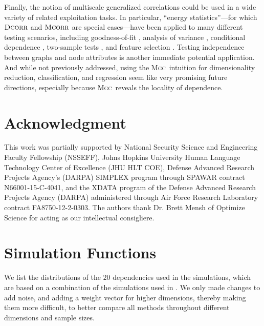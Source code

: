 \documentclass[11pt]{article}
\newcommand{\note}[2][]{\added[#1,remark={#2}]{}}
\providecommand{\sct}[1]{{\normalfont\textsc{#1}}}
\newcommand{\Mgc}{\sct{Mgc}}
\newcommand{\Dcorr}{\sct{Dcorr}}
\newcommand{\Mcorr}{\sct{Mcorr}}
\newcommand{\jv}[1]{{\note{jv: #1}}}
\newcommand{\cs}[1]{{\note{cs: #1}}}
\begin{document}
Finally, the notion of multiscale generalized correlations could be used in a wide variety of related exploitation tasks.  In particular, ``energy statistics''---for which $\Dcorr$ and $\Mcorr$ are special cases---have been applied to many different testing scenarios, including goodness-of-fit  \cite{Szekely2005}, analysis of variance  \cite{Rizzo2010}, conditional dependence  \cite{Szekely2014,Wang2015},  two-sample tests \cite{Szekely2004}, and feature selection \cite{LiZhongZhu2012,Zhong2015}.   
Testing independence between graphs and node attributes \cite{Fosdick2015} is another immediate potential application.  And while not previously addressed, using the \Mgc~intuition for dimensionality reduction, classification, and regression seem like very promising future directions, especially because \Mgc~reveals the locality of dependence.








\section*{Acknowledgment}
This work was partially supported by
%
National Security Science and Engineering Faculty Fellowship (NSSEFF),
%
Johns Hopkins University Human Language Technology Center of Excellence (JHU HLT COE),
%
Defense Advanced Research Projects Agency's (DARPA) SIMPLEX program through SPAWAR contract N66001-15-C-4041,
%
and the XDATA program of the Defense Advanced Research Projects Agency (DARPA) administered through Air Force Research Laboratory contract FA8750-12-2-0303. The authors thank Dr. Brett Mensh of Optimize Science for acting as our intellectual consigliere.


\clearpage
\appendix
\setcounter{figure}{0}
\renewcommand\thefigure{A\arabic{figure}}

\section{Simulation Functions}
\label{appen:function}

We list the distributions of the $20$ dependencies used in the simulations, which are based on a combination of the simulations used in \cite{SzekelyRizzoBakirov2007, SimonTibshirani2012, SimonTibshirani2012, GorfineHellerHeller2012}.  We only made changes to add noise, and adding a weight vector for higher dimensions, thereby making them more difficult, to better compare all methods throughout different dimensions and sample sizes.
\cs{is the above true? you had "some changes", which felt vague and suggested we changed things for our favor.} 
\jv{yes it is true. We do not alter anything to make MGC better, because it is always better! Those additions may make MGC advantages more distinguish-able in 1d and hd.}
\end{document}
